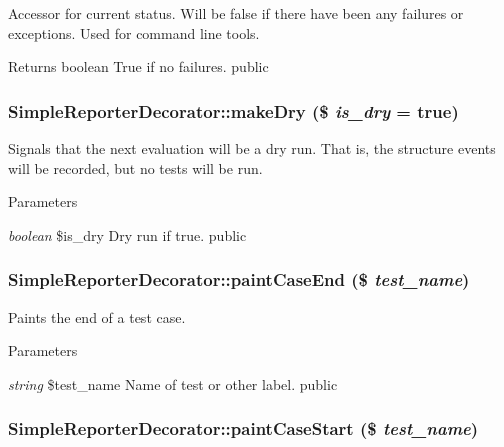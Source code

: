 \label{class_simple_reporter_decorator_a5270362707f6df0d37eb9f4b9d4ec339}
Accessor for current status. Will be false if there have been any failures or exceptions. Used for command line tools. \begin{DoxyReturn}{Returns}
boolean True if no failures.  public 
\end{DoxyReturn}
\hypertarget{class_simple_reporter_decorator_a8415a96af49c4f0a544319d6f81b85a4}{
\subsubsection[{makeDry}]{\setlength{\rightskip}{0pt plus 5cm}SimpleReporterDecorator::makeDry (\$ {\em is\_\-dry} = {\ttfamily true})}}
\label{class_simple_reporter_decorator_a8415a96af49c4f0a544319d6f81b85a4}
Signals that the next evaluation will be a dry run. That is, the structure events will be recorded, but no tests will be run. 
\begin{DoxyParams}{Parameters}
\item[{\em boolean}]\$is\_\-dry Dry run if true.  public \end{DoxyParams}
\hypertarget{class_simple_reporter_decorator_abf37b2557147287b9c3ca070736ee465}{
\subsubsection[{paintCaseEnd}]{\setlength{\rightskip}{0pt plus 5cm}SimpleReporterDecorator::paintCaseEnd (\$ {\em test\_\-name})}}
\label{class_simple_reporter_decorator_abf37b2557147287b9c3ca070736ee465}
Paints the end of a test case. 
\begin{DoxyParams}{Parameters}
\item[{\em string}]\$test\_\-name Name of test or other label.  public \end{DoxyParams}
\hypertarget{class_simple_reporter_decorator_aa6a8e6c378555a2b30339a3846c98144}{
\subsubsection[{paintCaseStart}]{\setlength{\rightskip}{0pt plus 5cm}SimpleReporterDecorator::paintCaseStart (\$ {\em test\_\-name})}}
